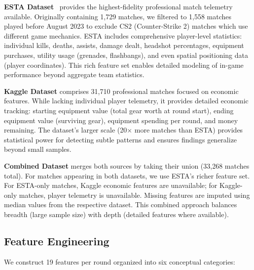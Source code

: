 \documentclass[10pt,twocolumn]{article}
\begin{document}
\textbf{ESTA Dataset}~\cite{xenopoulos2022} provides the highest-fidelity professional match telemetry available. Originally containing 1,729 matches, we filtered to 1,558 matches played before August 2023 to exclude CS2 (Counter-Strike 2) matches which use different game mechanics. ESTA includes comprehensive player-level statistics: individual kills, deaths, assists, damage dealt, headshot percentages, equipment purchases, utility usage (grenades, flashbangs), and even spatial positioning data (player coordinates). This rich feature set enables detailed modeling of in-game performance beyond aggregate team statistics.

\textbf{Kaggle Dataset} comprises 31,710 professional matches focused on economic features. While lacking individual player telemetry, it provides detailed economic tracking: starting equipment value (total gear worth at round start), ending equipment value (surviving gear), equipment spending per round, and money remaining. The dataset's larger scale (20× more matches than ESTA) provides statistical power for detecting subtle patterns and ensures findings generalize beyond small samples.

\textbf{Combined Dataset} merges both sources by taking their union (33,268 matches total). For matches appearing in both datasets, we use ESTA's richer feature set. For ESTA-only matches, Kaggle economic features are unavailable; for Kaggle-only matches, player telemetry is unavailable. Missing features are imputed using median values from the respective dataset. This combined approach balances breadth (large sample size) with depth (detailed features where available).

\subsection{Feature Engineering}

We construct 19 features per round organized into six conceptual categories:
\end{document}

